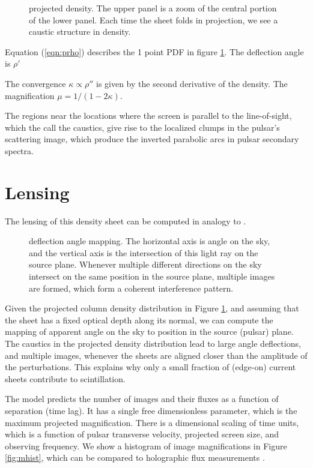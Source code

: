 \documentclass[useAMS,usenatbib]{mn2e}
\begin{document}
\begin{figure}
\centerline{}
\caption{projected density.  The upper panel is a zoom of the central
  portion of the lower panel. Each time the sheet folds in projection,
we see a caustic structure in density.}
\label{fig:rho}
\end{figure}

Equation (\ref{eqn:prho}) describes the 1 point PDF in figure
\ref{fig:rho}.  The deflection angle is $\rho'$

The convergence $\kappa \propto \rho''$ is given by
the second derivative of the density.  The magnification
$\mu=1/(1-2\kappa)$.

The regions near the locations where the screen is parallel
to the line-of-sight, which the call the caustics, give rise to the localized clumps in the pulsar's scattering image, which
produce the inverted parabolic arcs in pulsar secondary
spectra.

\section{Lensing}

The lensing of this density sheet can be computed in analogy to 
 \cite{2012MNRAS.421L.132P}.

\begin{figure}
\centerline{}
\caption{deflection angle mapping. The horizontal axis is angle on the
sky, and the vertical axis is the intersection of this light ray on
the source plane.  Whenever multiple different directions on the sky
intersect on the same position in the source plane, multiple images
are formed, which form a coherent interference pattern.}
\label{fig:dt}
\end{figure}

Given the projected column density distribution in Figure \ref{fig:rho}, and assuming that
the sheet has a fixed optical depth along its normal, we
can compute the mapping of apparent angle on the sky to position in the
source (pulsar) plane.  The caustics in the projected density
distribution lead to large angle deflections, and multiple images,
whenever the sheets are aligned closer than the amplitude of the
perturbations.  This explains why only a small fraction of (edge-on) current
sheets contribute to scintillation.

The model predicts the number of images and their fluxes as a
function of separation (time lag).  It has a single free dimensionless
parameter, which is the maximum projected magnification.  There is a
dimensional scaling of time units, which is a function of pulsar
transverse velocity, projected screen size, and observing frequency.
We show a histogram of image magnifications in Figure \ref{fig:mhist},
which can be compared to holographic flux measurements
\citep{2008MNRAS.388.1214W}.
\end{document}
